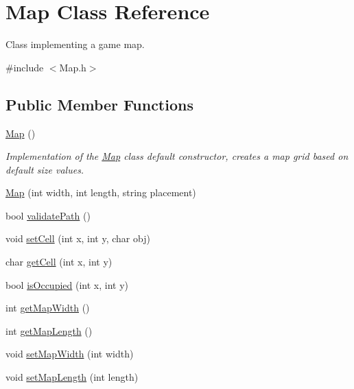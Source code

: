 \hypertarget{classMap}{}\section{Map Class Reference}
\label{classMap}


Class implementing a game map.  




{\ttfamily \#include $<$Map.\+h$>$}

\subsection*{Public Member Functions}
\begin{DoxyCompactItemize}
\item 
\hypertarget{classMap_a0f5ad0fd4563497b4214038cbca8b582}{}\label{classMap_a0f5ad0fd4563497b4214038cbca8b582} 
\hyperlink{classMap_a0f5ad0fd4563497b4214038cbca8b582}{Map} ()
\begin{DoxyCompactList}\small\item\em Implementation of the \hyperlink{classMap}{Map} class default constructor, creates a map grid based on default size values. \end{DoxyCompactList}\item 
\hyperlink{classMap_a6c356d09b5b7c946b5a3cf23dbabe0b2}{Map} (int width, int length, string placement)
\item 
bool \hyperlink{classMap_a91d9e239a9871b99a5d6d2d5d46b0504}{validate\+Path} ()
\item 
void \hyperlink{classMap_a33db81a058134a3a56b904ca3d3932fd}{set\+Cell} (int x, int y, char obj)
\item 
char \hyperlink{classMap_adcb714600f271eec55f28cdb4f92dbb3}{get\+Cell} (int x, int y)
\item 
bool \hyperlink{classMap_a79e5ced99d160ca9b680661169f16d84}{is\+Occupied} (int x, int y)
\item 
int \hyperlink{classMap_a286853d8475bc1bbede582c89e9b1491}{get\+Map\+Width} ()
\item 
int \hyperlink{classMap_aad03e74940d81cf9307bb0dae7e8814b}{get\+Map\+Length} ()
\item 
void \hyperlink{classMap_a58b540416c67a94fba30bf513397cf45}{set\+Map\+Width} (int width)
\item 
void \hyperlink{classMap_a6d3075b61e6b9fd06e0c75235a9629ed}{set\+Map\+Length} (int length)
\item 
\hypertarget{classMap_a837120a90bc4341c9557c1d7d6246fd7}{}\label{classMap_a837120a90bc4341c9557c1d7d6246fd7} 

\end{DoxyCompactItemize}
